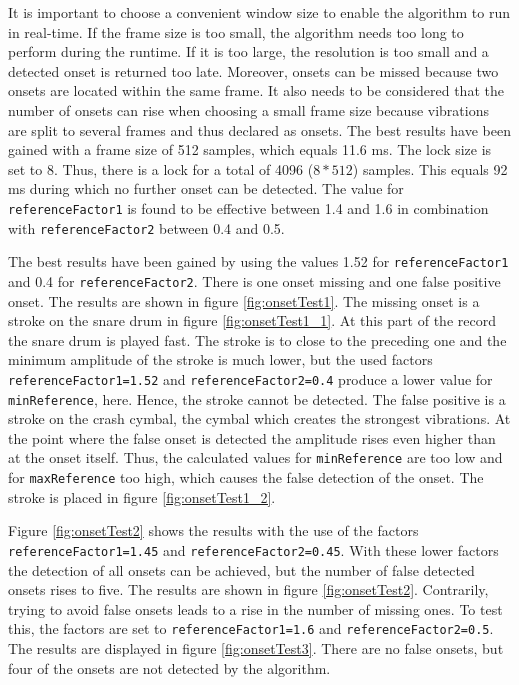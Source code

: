 It is important to choose a convenient window size to enable the algorithm to run in real-time. If the frame size is too small, the algorithm needs too long to perform during the runtime. If it is too large, the resolution is too small and a detected onset is returned too late. Moreover, onsets can be missed because two onsets are located within the same frame. It also needs to be considered that the number of onsets can rise when choosing a small frame size because vibrations are split to several frames and thus declared as onsets. The best results have been gained with a frame size of 512 samples, which equals 11.6 ms. The lock size is set to 8. Thus, there is a lock for a total of 4096 ($8*512$) samples. This equals 92 ms during which no further onset can be detected. The value for \lstinline{referenceFactor1} is found to be effective between 1.4 and 1.6 in combination with \lstinline{referenceFactor2} between 0.4 and 0.5. 

The best results have been gained by using the values 1.52 for \lstinline{referenceFactor1} and 0.4 for \lstinline{referenceFactor2}. There is one onset missing and one false positive onset. The results are shown in figure \ref{fig:onsetTest1}. The missing onset is a stroke on the snare drum in figure \ref{fig:onsetTest1_1}. At this part of the record the snare drum is played fast. The stroke is to close to the preceding one and the minimum amplitude of the stroke is much lower, but the used factors \lstinline{referenceFactor1=1.52} and \lstinline{referenceFactor2=0.4} produce a lower value for \lstinline{minReference}, here. Hence, the stroke cannot be detected. The false positive is a stroke on the crash cymbal, the cymbal which creates the strongest vibrations. At the point where the false onset is detected the amplitude rises even higher than at the onset itself. Thus, the calculated values for \lstinline{minReference} are too low and for \lstinline{maxReference} too high, which causes the false detection of the onset. The stroke is placed in figure \ref{fig:onsetTest1_2}.

\begin{sloppypar}
Figure \ref{fig:onsetTest2} shows the results with the use of the factors \lstinline{referenceFactor1=1.45} and \lstinline{referenceFactor2=0.45}. With these lower factors the detection of all onsets can be achieved, but the number of false detected onsets rises to five. The results are shown in figure \ref{fig:onsetTest2}. Contrarily, trying to avoid false onsets leads to a rise in the number of missing ones. To test this, the factors are set to \lstinline{referenceFactor1=1.6} and \lstinline{referenceFactor2=0.5}. The results are displayed in figure \ref{fig:onsetTest3}. There are no false onsets, but four of the onsets are not detected by the algorithm.
\end{sloppypar}

